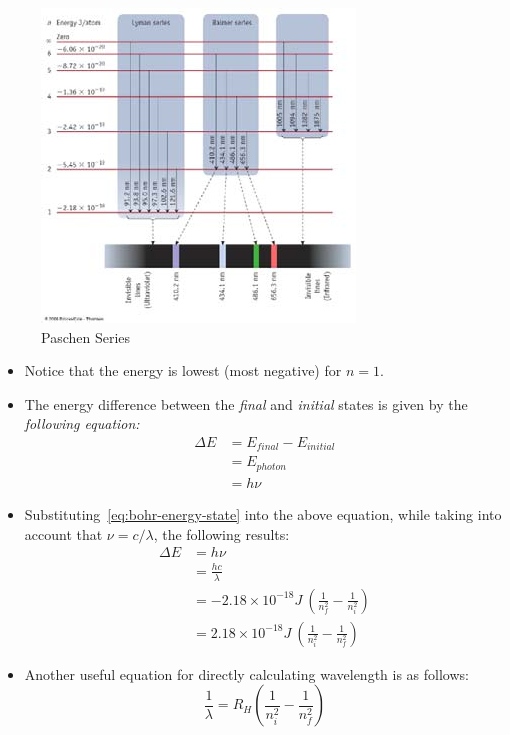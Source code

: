 \documentclass[
	chapter=7,
	title={Quantum Theory {\&} the Electronic Structure of Atoms},
	showanswers=true,
]{chem122notes}
\begin{document}
\begin{figure}[H]
	\centering
	\includegraphics[width=\textwidth]{chapter7/paschen_series}
	\caption{Paschen Series}
	\label{fig:paschen-series}
\end{figure}

\begin{itemize}
	\item Notice that the energy is lowest (most negative) for $n = 1$.
	\item The energy difference between the \textit{final} and \emph{initial} states is given by the \emph{following equation:}
	\begin{equation}
		\begin{aligned}
			\Delta E &= E_{final} - E_{initial}\\
			&= E_{photon}\\
			&= h\nu
		\end{aligned}
		\label{eq:electronic-transition-difference}
	\end{equation}
	\item Substituting~\eqref{eq:bohr-energy-state} into the above equation, while taking into account that $\nu = c / \lambda$, the following results:
	\begin{equation}
		\begin{aligned}
			\Delta E &= h\nu\\
			&= \frac{hc}{\lambda}\\
			&= -2.18 \times 10^{-18} J\ \left( \frac{1}{n_{f}^{2}} - \frac{1}{n_{i}^{2}} \right)\\
			&= 2.18 \times 10^{-18} J\ \left( \frac{1}{n_{i}^{2}} - \frac{1}{n_{f}^{2}} \right)
		\end{aligned}
		\label{eq:electron-transition}
	\end{equation}
	\item Another useful equation for directly calculating wavelength is as follows:
	\[ \frac{1}{\lambda} = R_{H}\left( \frac{1}{n_{i}^{2}} - \frac{1}{n_{f}^{2}} \right) \]
\end{itemize}
\end{document}

